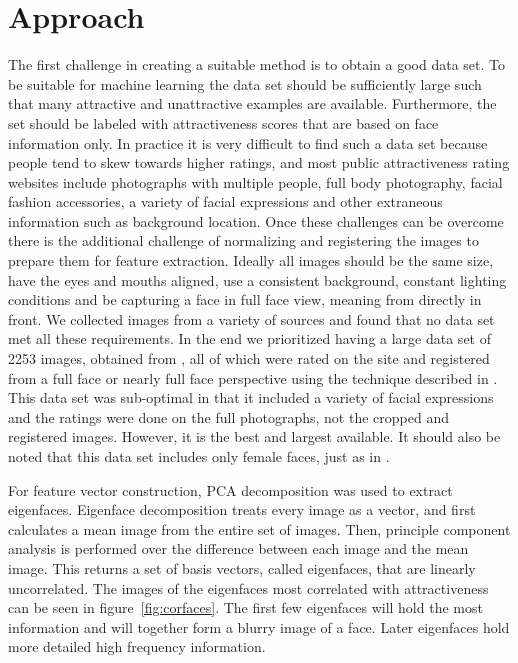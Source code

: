\documentclass[10pt,twocolumn,letterpaper]{article}
\begin{document}
\section{Approach}
The first challenge in creating a suitable method is to obtain a good data set. To be suitable for machine learning the data set should be sufficiently large such that many attractive and unattractive examples are available. Furthermore, the set should be labeled with attractiveness scores that are based on face information only. In practice it is very difficult to find such a data set because people tend to skew towards higher ratings, and most public attractiveness rating websites include photographs with multiple people, full body photography, facial fashion accessories, a variety of facial expressions and other extraneous information such as background location. Once these challenges can be overcome there is the additional challenge of normalizing and registering the images to prepare them for feature extraction. Ideally all images should be the same size, have the eyes and mouths aligned, use a consistent background, constant lighting conditions and be capturing a face in full face view, meaning from directly in front. We collected images from a variety of sources and found that no data set met all these requirements. In the end we prioritized having a large data set of 2253 images, obtained from \cite{dataset}, all of which were rated on the site  and registered from a full face or nearly full face perspective using the technique described in \cite{berg2004names}. This data set was sub-optimal in that it included a variety of facial expressions and the ratings were done on the full photographs, not the cropped and registered images. However, it is the best and largest available. It should also be noted that this data set includes only female faces, just as in \cite{eisenthal2006facial, kagian2006humanlike, kagian2008machine}.

For feature vector construction, PCA decomposition was used to extract eigenfaces. Eigenface decomposition treats every image as a vector, and first calculates a mean image from the entire set of images. Then, principle component analysis is performed over the difference between each image and the mean image. This returns a set of basis vectors, called eigenfaces, that are linearly uncorrelated. The images of the eigenfaces most correlated with attractiveness can be seen in figure~\ref{fig:corfaces}. The first few eigenfaces will hold the most information and will together form a blurry image of a face. Later eigenfaces hold more detailed high frequency information.
\end{document}
